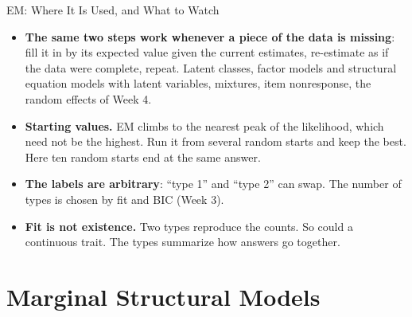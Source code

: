 \documentclass[aspectratio=169,11pt,xcolor=dvipsnames]{beamer}
\begin{document}
\begin{frame}{EM: Where It Is Used, and What to Watch}
\begin{itemize}\itemsep6pt
  \item \textbf{The same two steps work whenever a piece of the data is missing}: fill it in by
        its expected value given the current estimates, re-estimate as if the data were complete,
        repeat. Latent classes, factor models and structural equation models with latent
        variables, mixtures, item nonresponse, the random effects of Week 4.
  \item \textbf{Starting values.} EM climbs to the nearest peak of the likelihood, which need not
        be the highest. Run it from several random starts and keep the best. Here ten random
        starts end at the same answer.
  \item \textbf{The labels are arbitrary}: ``type 1'' and ``type 2'' can swap. The number of types
        is chosen by fit and BIC (Week 3).
  \item \textbf{Fit is not existence.} Two types reproduce the counts. So could a continuous
        trait. The types summarize how answers go together.
\end{itemize}
\end{frame}

\section[Treatments Over Time]{Marginal Structural Models}
\begin{frame}\sectionpage\end{frame}

\newcommand{\msmdag}[1]{%
\begin{tikzpicture}[dag]
  \node (A1) at (0cm,0cm) {$D_1$};
  \node (L) at (1.6cm,0cm) {$L$};
  \node (A2) at (3.2cm,0cm) {$D_2$};
  \node (Y) at (4.8cm,0cm) {$Y$};
  \node[unobs] (U) at (3.2cm,1.55cm) {$U$};
  \draw[arr] (A1) -- (L); \draw[arr] (L) -- (A2); \draw[arr] (A2) -- (Y);
  \draw[arr] (A1) to[bend right=34] (A2);
  \draw[arr] (A1) to[bend right=48] (Y);
  \draw[arr] (L) to[bend left=34] (Y);
  \draw[uarr] (U) -- (L); \draw[uarr] (U) -- (Y);
  #1
\end{tikzpicture}}
\end{document}

